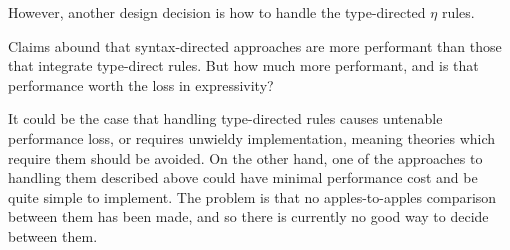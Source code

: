 
However, another design decision is how to handle the type-directed $\eta$ rules.

Claims abound that syntax-directed approaches are more performant than those that integrate type-direct rules.
But how much more performant, and is that performance worth the loss in expressivity?

It could be the case that handling type-directed rules causes untenable performance loss, or requires unwieldy implementation, meaning theories which require them should be avoided.
On the other hand, one of the approaches to handling them described above could have minimal performance cost and be quite simple to implement.
The problem is that no apples-to-apples comparison between them has been made, and so there is currently no good way to decide between them.

%


